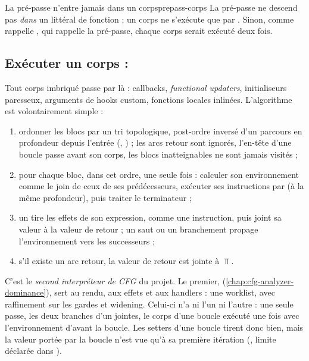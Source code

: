 \begin{invariant}{La pré-passe n'entre jamais dans un corps}{prepass-corps}
  La pré-passe ne descend pas \emph{dans} un littéral de fonction ; un corps
  ne s'exécute que par . Sinon, comme
   rappelle , qui rappelle la
  pré-passe, chaque corps serait exécuté deux fois.
\end{invariant}

\subsection{Exécuter un corps : }


Tout corps imbriqué passe par là : callbacks, \emph{functional updaters},
initialiseurs paresseux, arguments de hooks custom, fonctions locales
inlinées. L'algorithme est volontairement simple :
\begin{enumerate}
  \item ordonner les blocs par un tri topologique, post-ordre inversé d'un
    parcours en profondeur depuis l'entrée (,
    ) ; les arcs retour sont ignorés,
    l'en-tête d'une boucle passe avant son corps, les blocs inatteignables ne
    sont jamais visités ;
  \item pour chaque bloc, dans cet ordre, une seule fois : calculer son
    environnement comme le join de ceux de ses prédécesseurs, exécuter ses
    instructions par  (à la même profondeur), puis
    traiter le terminateur ;
  \item un  tire les effets de son expression, comme une
    instruction, puis joint sa valeur à la valeur de retour ; un saut ou un
    branchement propage l'environnement vers les successeurs ;
  \item s'il existe un arc retour, la valeur de retour est jointe à $\Top$.
\end{enumerate}

C'est le \emph{second interpréteur de CFG} du projet. Le premier,
 (\cref{chap:cfg-analyzer-dominance}), sert au rendu, aux
effets et aux handlers : une worklist, avec raffinement sur les gardes et
widening. Celui-ci n'a ni l'un ni l'autre : une seule passe, les deux
branches d'un  jointes, le corps d'une boucle exécuté une
fois avec l'environnement d'avant la boucle. Les setters d'une boucle tirent
donc bien, mais la valeur portée par la boucle n'est vue qu'à sa première
itération (, limite déclarée dans ).


